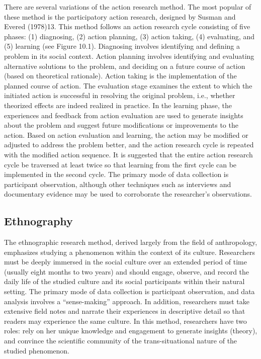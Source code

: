 There are several variations of the action research method. The most popular of these method is the participatory action research, designed by Susman and Evered (1978)13. This method follows an action research cycle consisting of five phases: (1) diagnosing, (2) action planning, (3) action taking, (4) evaluating, and (5) learning (see Figure 10.1). Diagnosing involves identifying and defining a problem in its social context. Action planning involves identifying and evaluating alternative solutions to the problem, and deciding on a future course of action (based on theoretical rationale). Action taking is the implementation of the planned course of action. The evaluation stage examines the extent to which the initiated action is successful in resolving the original problem, i.e., whether theorized effects are indeed realized in practice. In the learning phase, the experiences and feedback from action evaluation are used to generate insights about the problem and suggest future modifications or improvements to the action. Based on action evaluation and learning, the action may be modified or adjusted to address the problem better, and the action research cycle is repeated with the modified action sequence. It is suggested that the entire action research cycle be traversed at least twice so that learning from the first cycle can be implemented in the second cycle. The primary mode of data collection is participant observation, although other techniques such as interviews and documentary evidence may be used to corroborate the researcher's observations.


\subsection{Ethnography}

The ethnographic research method, derived largely from the field of anthropology, emphasizes studying a phenomenon within the context of its culture. Researchers must be deeply immersed in the social culture over an extended period of time (usually eight months to two years) and should engage, observe, and record the daily life of the studied culture and its social participants within their natural setting. The primary mode of data collection is participant observation, and data analysis involves a ``sense-making'' approach. In addition, researchers must take extensive field notes and narrate their experiences in descriptive detail so that readers may experience the same culture. In this method, researchers have two roles: rely on her unique knowledge and engagement to generate insights (theory), and convince the scientific community of the trans-situational nature of the studied phenomenon.

